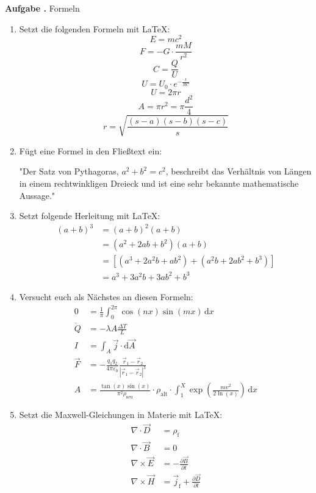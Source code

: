 \documentclass[a4paper, 12pt, headsepline, parskip=half-, headlines=3.1]{scrartcl}
\newcounter{aufgabe}
\newenvironment{aufgabe}[1][]{\stepcounter{aufgabe}
\noindent\textbf{Aufgabe \arabic{aufgabe}.} #1\par
\begin{enumerate}[label=\alph*)]}{\end{enumerate}\bigskip}
\begin{document}
\begin{aufgabe}[Formeln]
	\item Setzt die folgenden Formeln mit \LaTeX:
	\begin{equation}
		E = mc^2
	\end{equation}	
	\begin{equation}
		\label{eq:newton}
		F = -G ⋅ \frac{mM}{r^2}
	\end{equation}	
	\begin{equation}
		C = \frac{Q}{U}
	\end{equation}	
	\begin{equation}
		U = U_0 ⋅ e^{-\frac{t}{RC}}
	\end{equation}	
	\begin{equation}
		\label{eq:circle_circumference}
		U = 2πr
	\end{equation}
	\begin{equation}\label{eq:circle_area}
		A = πr^2 = π\frac{d^2}{4}
	\end{equation}
	\begin{equation}
		r = \sqrt{\frac{(s-a)(s-b)(s-c)}{s}}
	\end{equation}
	\item Fügt eine Formel in den Fließtext ein:
	
	"Der Satz von Pythagoras, $a^2 + b^2 = c^2$, beschreibt das Verhältnis von Längen in einem rechtwinkligen Dreieck und ist eine sehr bekannte mathematische Aussage."
	\item Setzt folgende Herleitung mit \LaTeX:
	\begin{align*}
		(a + b)^3
		&= (a + b)^2 (a + b) \\
		&= (a^2 + 2ab + b^2) (a + b) \\
		&= \left[(a^3 + 2 a^2 b + a b^2) + (a^2 b + 2 a b^2 + b^3)\right] \\
		&= a^3 + 3 a^2 b + 3 a b^2 + b^3
	\end{align*}
	\item Versucht euch als Nächstes an diesen Formeln:
	\begin{align*}
		0 &= \frac{1}{π} ∫_0^{2π} \cos(nx) \sin(mx) \, \mathrm{d}x\\
		\dot{Q} &= - λA \frac{ΔT}{L}\\
		I &= ∫_A \vec{j} ⋅ \mathrm{d}\vec{A}\\
		\vec{F} &= - \frac{q_1 q_2}{4πε_0} \frac{\vec{r}_1 - \vec{r}_2}{|\vec{r}_1 - \vec{r}_2|^3} \\
		A &= \frac{\tan(x) \sin(x)}{π^2 ρ_{\text{neu}}} ⋅ ρ_{\text{alt}} ⋅ ∫_1^X \exp\!\left(\frac{m v^2}{2\ln(x)}\right) \, \mathrm{d}x
	\end{align*}
	\item Setzt die Maxwell-Gleichungen in Materie mit \LaTeX:
	\begin{align}
		\label{eq:max1}
		∇ ⋅ \vec{D} &= ρ_\text{f} \\
		∇ ⋅ \vec{B} &= 0 \\
		∇ × \vec{E} &= -\frac{∂\vec{B}}{∂t} \\
		\label{eq:max4}
		∇ × \vec{H} &= \vec{j}_\text{f} + \frac{∂\vec{D}}{∂t}
	\end{align}
	

\end{aufgabe}
\end{document}
